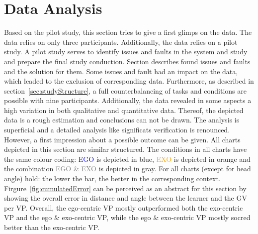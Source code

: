 \section{Data Analysis}
Based on the pilot study, this section tries to give a first glimps on the data. The data relies on only three participants. Additionally, the data relies on a pilot study. A pilot study serves to identify issues and faults in the system and study and prepare the final study conduction. Section describes found issues and faults and the solution for them. Some issues and fault had an impact on the data, which leaded to the exclusion of corresponding data. Furthermore, as described in section~\ref{sec:studyStructure}, a full counterbalancing of tasks and conditions are possible with nine participants. Additionally, the data revealed in some aspects a high variation in both qualitative and quantitative data. Thereof, the depicted data is a rough estimation and conclusions can not be drawn. The analysis is superficial and a detailed analysis like significats verification is renounced. However, a first impression about a possible outcome can be given. All charts depicted in this section are similar structured. The conditions in all charts have the same colour coding: \textcolor{blue}{EGO} is depicted in blue, \textcolor{orange}{EXO} is depicted in orange and the combination \textcolor{gray}{EGO \& EXO} is depicted in gray. For all charts (except for head angle) hold: the lower the bar, the better in the corresponding context.\\
Firgure~\ref{fig:cumulatedError} can be perceived as an abstract for this section by showing the overall error in distance and angle between the learner and the GV per VP. Overall, the ego-centric VP mostly outperformed both the exo-centric VP and the ego \& exo-centric VP, while the ego \& exo-centric VP mostly socred better than the exo-centric VP.
